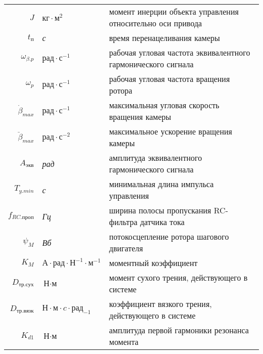 \begin{table}[ht!]
\begin{tabular}{rll}
    $J$                 & $\textit{кг} \cdot \textit{м}^{2}$ & момент инерции объекта управления относительно оси привода \\

    $t_\textit{п}$      & \textit{с} & время перенацеливания камеры \\

    $\omega_{\beta.p}$  & $ \textit{рад} \cdot \textit{с}^{-1} $ & рабочая угловая
                            частота эквивалентного гармонического сигнала \\

    $\omega_{p}$        & $ \textit{рад} \cdot \textit{с}^{-1} $ & рабочая угловая
                            частота вращения ротора \\

    $\dot{\beta}_{max}$  & $\textit{рад} \cdot \textit{с}^{-1}$ & максимальная угловая скорость вращения камеры \\

    $\ddot{\beta}_{max}$ & $ \textit{рад} \cdot \textit{с}^{-2} $ & максимальное ускорение вращения камеры \\

    $A_{\textit{экв}}$   & \textit{рад} & амплитуда эквивалентного гармонического сигнала \\

    $T_{y.min}$          & \textit{с} & минимальная длина импульса управления \\

    $f_{RC.\textit{проп}}$ & \textit{Гц} & ширина полосы пропускания RC-фильтра датчика тока \\

    $\psi_{M}$           & \textit{Вб} & потокосцепление ротора шагового двигателя \\

    $K_{M}$              & $\textit{А} \cdot \textit{рад} \cdot \textit{Н}^{-1} \cdot \textit{м}^{-1}$ & моментный коэффициент \\

    $D_{\textit{тр.сух}}$  & $\textit{Н} \cdot \textit{м}$ & момент сухого трения, действующего в системе \\

    $D_{\textit{тр.вязк}}$  & $\textit{Н} \cdot \textit{м} \cdot \textit{c} \cdot \textit{рад}_{-1}$ & коэффициент вязкого трения, действующего в системе \\

    $K_{d1}$             & $\textit{Н} \cdot \textit{м}$ & амплитуда первой гармоники резонанса момента \\


\end{tabular}
\end{table}

